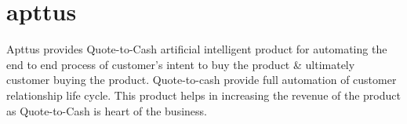 \section{apttus}

Apttus provides Quote-to-Cash artificial intelligent product for automating the end to end process of customer's intent to buy the product \& ultimately customer buying the product. Quote-to-cash provide full automation of customer relationship life cycle. This product helps in increasing the revenue of the product as Quote-to-Cash is heart of the business. \cites{hid-sp18-511-apttus}
